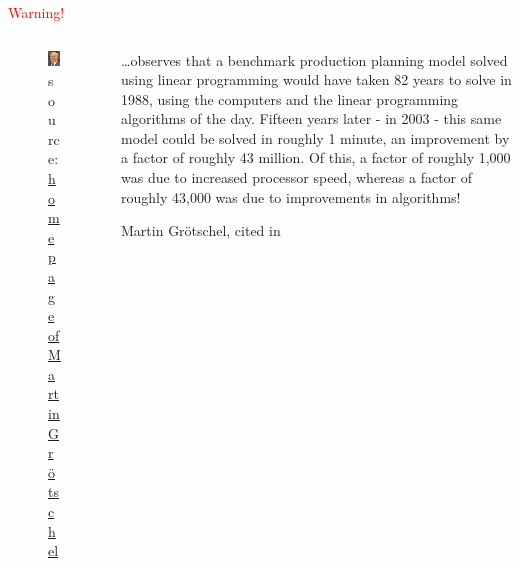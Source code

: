 \documentclass[9pt,xcolor=table]{beamer}
\begin{document}
\begin{frame}
\frametitle{\insertsection{}}
\begin{center}
  \huge\textcolor{red}{Warning!}
\end{center}
\begin{columns}[c]
  \begin{column}{.35\textwidth}
    \begin{figure}[htb]
      \includegraphics[width=.8\textwidth]{img/MartinGroetschel}\\[6pt]\small
      source: \href{http://www.zib.de/groetschel/Meine-Galerie/MartinGroetschel.JPG.html}{homepage of Martin Gr\"otschel}
    \end{figure}
  \end{column}
  \begin{column}{.6\textwidth}
\large
  \dots observes that a benchmark production planning model solved using linear programming would have taken 82 years to solve in 1988, using the computers and the linear programming algorithms of the day. Fifteen years later - in 2003 - this same model could be solved in roughly 1 minute, an improvement by a factor of roughly 43 million. Of this, a factor of roughly 1,000 was due to increased processor speed, \alert<2->{whereas a factor of roughly 43,000 was due to improvements in algorithms}!\\[12pt]
  \begin{raggedright}
    \small{Martin Gr\"otschel, cited in \cite{DesigningDigitalFuture}}
  \end{raggedright}
  \end{column}
\end{columns}
\end{frame}
\end{document}
